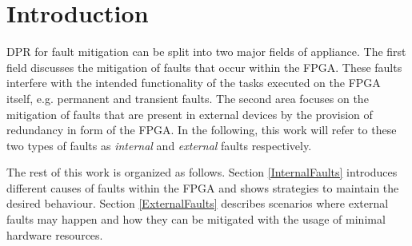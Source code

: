 \section{Introduction}\label{Introduction}
\gls{DPR} for fault mitigation can be split into two major fields of appliance. 
The first field discusses the mitigation of faults that occur within the \gls{FPGA}.
These faults interfere with the intended functionality of the tasks executed on the \gls{FPGA} itself, e.g. permanent and transient faults. 
The second area focuses on the mitigation of faults that are present in external devices by the provision of redundancy in form of the \gls{FPGA}.
In the following, this work will refer to these two types of faults as \textit{internal} and \textit{external} faults respectively.

The rest of this work is organized as follows.
Section \ref{InternalFaults} introduces different causes of faults within the \gls{FPGA} and shows strategies to maintain the desired behaviour.
Section \ref{ExternalFaults} describes scenarios where external faults may happen and how they can be mitigated with the usage of minimal hardware resources. 

